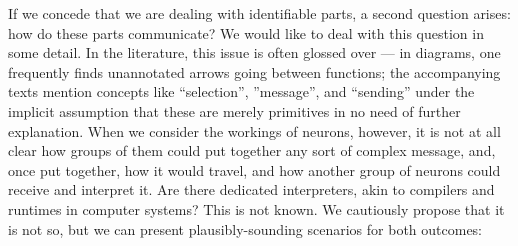 If we concede that we are dealing with identifiable parts, a second question arises: how do these parts communicate? We would like to deal with this question in some detail. In the literature, this issue is often glossed over --- in diagrams, one frequently finds unannotated arrows going between functions; the accompanying texts mention concepts like ``selection'', ''message'', and ``sending'' under the implicit assumption that these are merely primitives in no need of further explanation. When we consider the workings of neurons, however, it is not at all clear how groups of them could put together any sort of complex message, and, once put together, how it would travel, and how another group of neurons could receive and interpret it. Are there dedicated interpreters, akin to compilers and runtimes in computer systems? This is not known. We cautiously propose that it is not so, but we can present plausibly-sounding scenarios for both outcomes:

